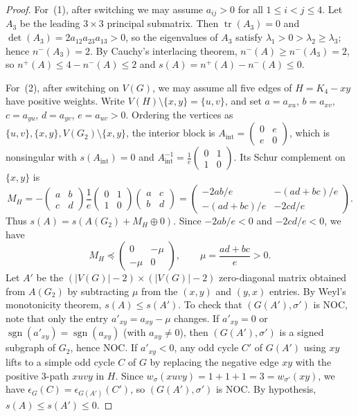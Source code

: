 \documentclass[10pt,letterpaper]{article}
\theoremstyle{zetaplain}
\theoremstyle{zetadef}
\theoremstyle{remark}
\numberwithin{equation}{section}
\DeclareMathOperator{\sgn}{sgn}
\DeclareMathOperator{\tr}{tr}
\begin{document}
\begin{proof}
For~(1), after switching we may assume $a_{ij} > 0$ for all $1 \le i < j \le 4$. Let $A_3$ be the leading $3 \times 3$ principal submatrix. Then $\tr(A_3) = 0$ and $\det(A_3) = 2 a_{12} a_{23} a_{13} > 0$, so the eigenvalues of $A_3$ satisfy $\lambda_1 > 0 > \lambda_2 \ge \lambda_3$; hence $n^-(A_3) = 2$. By Cauchy's interlacing theorem, $n^-(A) \ge n^-(A_3) = 2$, so $n^+(A) \le 4 - n^-(A) \le 2$ and $s(A) = n^+(A) - n^-(A) \le 0$.

For~(2), after switching on $V(G)$, we may assume all five edges of $H = K_4 - xy$ have positive weights. Write $V(H) \setminus \{x, y\} = \{u, v\}$, and set $a = a_{xu}$, $b = a_{xv}$, $c = a_{yu}$, $d = a_{yv}$, $e = a_{uv} > 0$. Ordering the vertices as $\{u, v\}, \{x, y\}, V(G_2) \setminus \{x, y\}$, the interior block is $A_{\mathrm{int}} = \begin{pmatrix} 0 & e \\ e & 0 \end{pmatrix}$, which is nonsingular with $s(A_{\mathrm{int}}) = 0$ and $A_{\mathrm{int}}^{-1} = \frac{1}{e}\begin{pmatrix} 0 & 1 \\ 1 & 0 \end{pmatrix}$. Its Schur complement on $\{x, y\}$ is
\[
  M_H = -\begin{pmatrix} a & b \\ c & d \end{pmatrix} \frac{1}{e}\begin{pmatrix} 0 & 1 \\ 1 & 0 \end{pmatrix} \begin{pmatrix} a & c \\ b & d \end{pmatrix}
  = \begin{pmatrix} -2ab/e & -(ad+bc)/e \\ -(ad+bc)/e & -2cd/e \end{pmatrix}.
\]
Thus $s(A) = s(A(G_2) + M_H \oplus 0)$. Since $-2ab/e < 0$ and $-2cd/e < 0$, we have
\[
  M_H \preceq \begin{pmatrix} 0 & -\mu \\ -\mu & 0 \end{pmatrix}, \qquad \mu = \frac{ad + bc}{e} > 0.
\]
Let $A'$ be the $(|V(G)| - 2) \times (|V(G)| - 2)$ zero-diagonal matrix obtained from $A(G_2)$ by subtracting $\mu$ from the $(x, y)$ and $(y, x)$ entries. By Weyl's monotonicity theorem, $s(A) \le s(A')$. To check that $(G(A'), \sigma')$ is NOC, note that only the entry $a'_{xy} = a_{xy} - \mu$ changes. If $a'_{xy} = 0$ or $\sgn(a'_{xy}) = \sgn(a_{xy})$ (with $a_{xy} \ne 0$), then $(G(A'), \sigma')$ is a signed subgraph of $G_2$, hence NOC. If $a'_{xy} < 0$, any odd cycle $C'$ of $G(A')$ using $xy$ lifts to a simple odd cycle $C$ of $G$ by replacing the negative edge $xy$ with the positive $3$-path $xuvy$ in $H$. Since $w_\sigma(xuvy) = 1 + 1 + 1 = 3 = w_{\sigma'}(xy)$, we have $\epsilon_G(C) = \epsilon_{G(A')}(C')$, so $(G(A'), \sigma')$ is NOC. By hypothesis, $s(A) \le s(A') \le 0$.
\end{proof}
\end{document}
